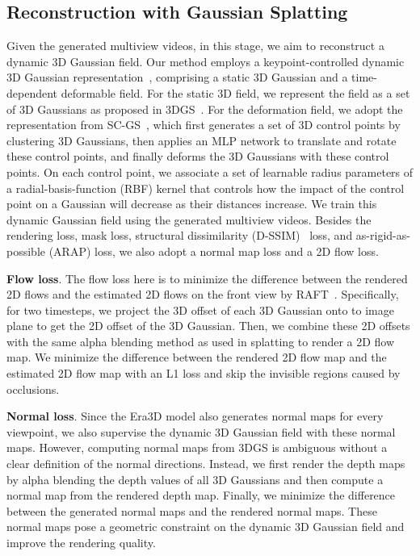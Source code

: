 \subsection{Reconstruction with Gaussian Splatting}
\label{sec:recon}

Given the generated multiview videos, in this stage, we aim to reconstruct a dynamic 3D Gaussian field. Our method employs a keypoint-controlled dynamic 3D Gaussian representation~\citep{huang2024sc}, comprising a static 3D Gaussian and a time-dependent deformable field. For the static 3D field, we represent the field as a set of 3D Gaussians as proposed in 3DGS~\citep{kerbl20233dgs}. For the deformation field, we adopt the representation from SC-GS~\citep{huang2024sc}, which first generates a set of 3D control points by clustering 3D Gaussians, then applies an MLP network to translate and rotate these control points, and finally deforms the 3D Gaussians with these control points. On each control point, we associate a set of learnable radius parameters of a radial-basis-function (RBF) kernel that controls how the impact of the control point on a
Gaussian will decrease as their distances increase. We train this dynamic Gaussian field using the generated multiview videos. Besides the rendering loss, mask loss, structural dissimilarity (D-SSIM)~\citep{kerbl20233dgs} loss, and as-rigid-as-possible (ARAP) loss, we also adopt a normal map loss and a 2D flow loss.

\textbf{Flow loss}. The flow loss here is to minimize the difference between the rendered 2D flows and the estimated 2D flows on the front view by RAFT~\citep{teed2020raft}. Specifically, for two timesteps, we project the 3D offset of each 3D Gaussian onto to image plane to get the 2D offset of the 3D Gaussian. Then, we combine these 2D offsets with the same alpha blending method as used in splatting to render a 2D flow map. We minimize the difference between the rendered 2D flow map and the estimated 2D flow map with an L1 loss and skip the invisible regions caused by occlusions. 

\textbf{Normal loss}. Since the Era3D model also generates normal maps for every viewpoint, we also supervise the dynamic 3D Gaussian field with these normal maps. However, computing normal maps from 3DGS is ambiguous without a clear definition of the normal directions. Instead, we first render the depth maps by alpha blending the depth values of all 3D Gaussians and then compute a normal map from the rendered depth map. Finally, we minimize the difference between the generated normal maps and the rendered normal maps. These normal maps pose a geometric constraint on the dynamic 3D Gaussian field and improve the rendering quality.


